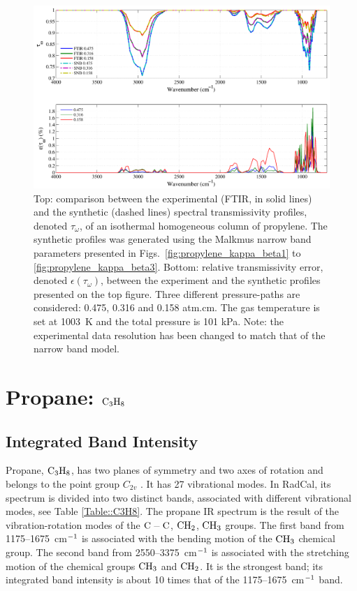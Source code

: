 \begin{figure}[p]
\includegraphics[width=\textwidth]{Figures/Comparison_Fit_Propylene_MALKMUS_Temp1003K.pdf}
\caption{Top: comparison between the experimental (FTIR, in solid lines) and the synthetic (dashed lines) spectral transmissivity profiles, denoted $\tau_{\omega}$, of an isothermal homogeneous column of propylene. The synthetic profiles was generated using the Malkmus narrow band parameters presented in Figs.~\ref{fig:propylene_kappa_beta1} to \ref{fig:propylene_kappa_beta3}. Bottom: relative transmissivity error, denoted $\epsilon{(\tau_{\omega})}$, between the experiment and the synthetic profiles presented on the top figure. Three different pressure-paths are considered: 0.475, 0.316 and 0.158 atm.cm. The gas temperature is set at 1003~K and the total pressure is 101 kPa. Note: the experimental data resolution has been changed to match that of the narrow band model. \label{fig:propylene_SNBVerify_1003K}}
\end{figure}


\clearpage

\section{Propane: $\rm C_3H_8$}

\subsection{Integrated Band Intensity}

Propane, $\rm C_3H_8$, has two planes of symmetry and two axes of rotation and belongs to the point group $C_{2v}$ \cite{Herzberg1949}. It has 27 vibrational modes. In RadCal, its spectrum is divided into two distinct bands, associated with different vibrational modes, see Table \ref{Table::C3H8}. The propane IR spectrum is the result of the vibration-rotation modes of the $\rm C-C$, $\rm CH_2$, $\rm CH_3$ groups.
The first band from 1175--1675~cm$\rm ^{-1}$ is associated with the bending motion of the $\rm CH_3$ chemical group. The second band from 2550--3375~cm$\rm ^{-1}$ is associated with the stretching motion of the chemical groups $\rm CH_3$ and $\rm CH_2$. It is the strongest band; its integrated band intensity is about 10 times that of the 1175--1675~cm$\rm ^{-1}$ band.

